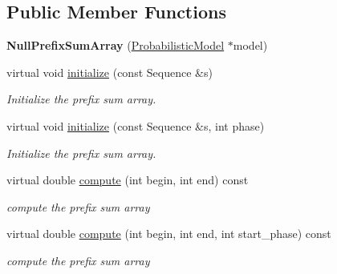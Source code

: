 \subsection*{Public Member Functions}
\begin{DoxyCompactItemize}
\item 
\mbox{\label{classtops_1_1NullPrefixSumArray_a6484f01a4d946904579f9e8b1fa43401}} 
{\bfseries Null\+Prefix\+Sum\+Array} (\hyperlink{classtops_1_1ProbabilisticModel}{Probabilistic\+Model} $\ast$model)
\item 
\mbox{\label{classtops_1_1NullPrefixSumArray_ae6669246f6f5526b0a448d29d426ef96}} 
virtual void \hyperlink{classtops_1_1NullPrefixSumArray_ae6669246f6f5526b0a448d29d426ef96}{initialize} (const Sequence \&s)
\begin{DoxyCompactList}\small\item\em Initialize the prefix sum array. \end{DoxyCompactList}\item 
\mbox{\label{classtops_1_1NullPrefixSumArray_aace3b5ad91e803c30ca9778decc19435}} 
virtual void \hyperlink{classtops_1_1NullPrefixSumArray_aace3b5ad91e803c30ca9778decc19435}{initialize} (const Sequence \&s, int phase)
\begin{DoxyCompactList}\small\item\em Initialize the prefix sum array. \end{DoxyCompactList}\item 
\mbox{\label{classtops_1_1NullPrefixSumArray_a243097d37111e9599fe3c9c4d55b06ff}} 
virtual double \hyperlink{classtops_1_1NullPrefixSumArray_a243097d37111e9599fe3c9c4d55b06ff}{compute} (int begin, int end) const
\begin{DoxyCompactList}\small\item\em compute the prefix sum array \end{DoxyCompactList}\item 
\mbox{\label{classtops_1_1NullPrefixSumArray_a94705fd0063678e6ad02292ae4cc192f}} 
virtual double \hyperlink{classtops_1_1NullPrefixSumArray_a94705fd0063678e6ad02292ae4cc192f}{compute} (int begin, int end, int start\+\_\+phase) const
\begin{DoxyCompactList}\small\item\em compute the prefix sum array \end{DoxyCompactList}\end{DoxyCompactItemize}


